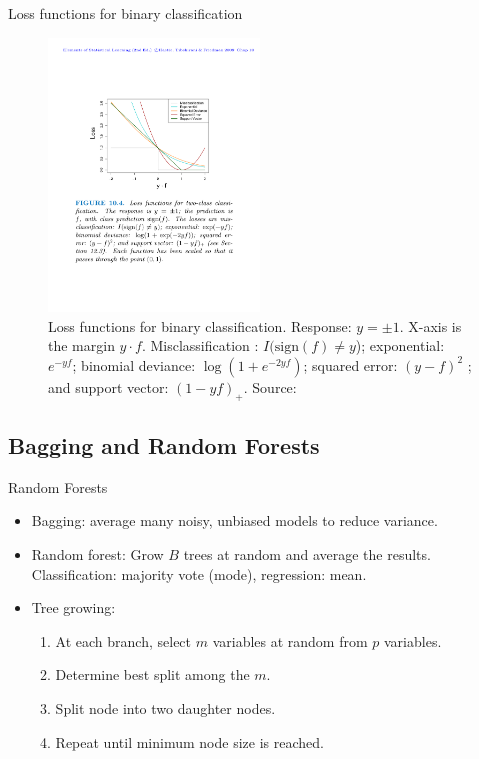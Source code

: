 \documentclass{beamer}
\begin{document}
\begin{frame}{Loss functions for binary classification}
\begin{figure}
    \centering
    \includegraphics[width=0.5\textwidth]{figures/lossfunctions.pdf}
    \caption{Loss functions for binary classification. Response: $y = \pm1$. X-axis is the margin $y \cdot f$. Misclassification : $I(\mathrm{sign}(f) \neq y$); exponential: $e^{-yf}$; binomial deviance: $\log(1 + e^{-2yf})$; squared error: $(y - f)^2$ ; and support vector: $(1 - yf)_+$. Source: \cite{hastieElementsStatisticalLearning2016}}
\end{figure}
\end{frame}


\subsection{Bagging and Random Forests}

\begin{frame}{Random Forests}
    \begin{itemize}
        \item Bagging: average many noisy, unbiased models to reduce variance.
        \item Random forest: Grow $B$ trees at random and average the results. Classification: majority vote (mode), regression: mean.
        \item Tree growing:
        \begin{enumerate}
            \item At each branch, select $m$ variables at random from $p$ variables.
            \item Determine best split among the $m$.
            \item Split node into two daughter nodes.
            \item Repeat until minimum node size is reached.
        \end{enumerate}
        
    \end{itemize}
\end{frame}
\end{document}
